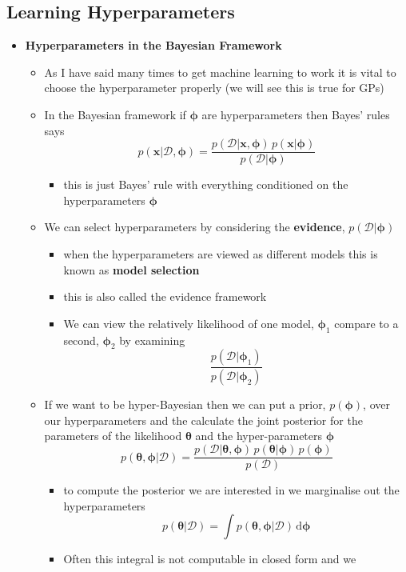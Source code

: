 \documentclass[11pt]{article}
\newcommand{\dd}{\mathrm{d}}
\begin{document}
\subsection{Learning Hyperparameters}
\label{sec:org5077e64}
\begin{itemize}
\item \textbf{Hyperparameters in the Bayesian Framework}
\begin{itemize}
\item As I have said many times to get machine learning to work it is
vital to choose the hyperparameter properly (we will see this
is true for GPs)
\item In the Bayesian framework if \(\bm{\phi}\) are hyperparameters
then Bayes' rules says
$$ p(\bm{x}|\mathcal{D},\bm{\phi}) =
       \frac{p(\mathcal{D}|\bm{x},\bm{\phi}) \,
       p(\bm{x}|\bm{\phi})}{p(\mathcal{D}|\bm{\phi}) } $$
\begin{itemize}
\item this is just Bayes' rule with everything conditioned on the
hyperparameters \(\bm{\phi}\)
\end{itemize}
\item We can select hyperparameters by considering the \textbf{evidence},
\(p(\mathcal{D}|\bm{\phi})\)
\begin{itemize}
\item when the hyperparameters are viewed as different models this is
known as \textbf{model selection}
\item this is also called the evidence framework
\item We can view the relatively likelihood of one model,
\(\bm{\phi}_1\) compare to a second, \(\bm{\phi}_2\) by examining
$$ \frac{p(\mathcal{D}|\bm{\phi}_1)}{p(\mathcal{D}|\bm{\phi}_2)} $$
\end{itemize}
\item If we want to be hyper-Bayesian then we can put a prior,
\(p(\bm{\phi})\), over our hyperparameters and the calculate the
joint posterior for the parameters of the likelihood
\(\bm{\theta}\) and the hyper-parameters \(\bm{\phi}\)
$$ p(\bm{\theta},\bm{\phi}| \mathcal{D}) = \frac{p(\mathcal{D}|
       \bm{\theta},\bm{\phi}) \, p(\bm{\theta}|\bm{\phi}) \, p(\bm{\phi})}{
       p(\mathcal{D})} $$
\begin{itemize}
\item to compute the posterior we are interested in we marginalise
out the hyperparameters
$$ p(\bm{\theta}|\mathcal{D}) = \int
         p(\bm{\theta},\bm{\phi}| \mathcal{D}) \,\dd \bm{\phi} $$
\item Often this integral is not computable in closed form and we

\end{itemize}
\end{itemize}
\end{itemize}
\end{document}
